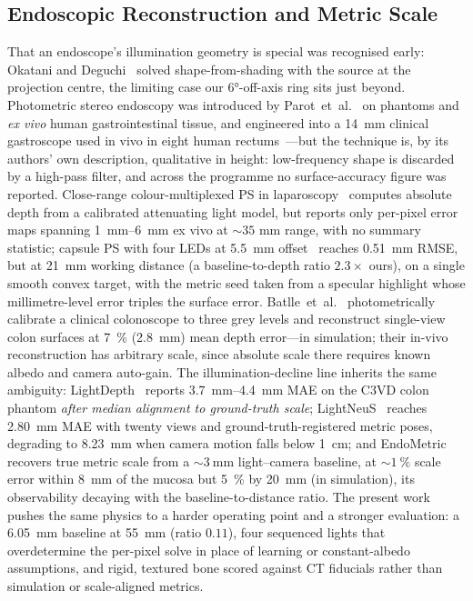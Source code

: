 \documentclass[conference]{IEEEtran}
\begin{document}
\subsection{Endoscopic Reconstruction and Metric Scale}
That an endoscope's illumination geometry is special was recognised
early: Okatani and Deguchi~\cite{okatani1997shape} solved shape-from-shading
with the source at the projection centre, the limiting case our
\ang{6}-off-axis ring sits just beyond.  Photometric stereo endoscopy was
introduced by Parot~et~al.~\cite{parot2013photometric} on phantoms and
\emph{ex vivo} human gastrointestinal tissue, and engineered into a
\SI{14}{\milli\meter} clinical gastroscope used in vivo in eight human
rectums~\cite{durr2014system}---but the technique is, by its authors'
own description, qualitative in height: low-frequency shape is discarded
by a high-pass filter, and across the programme no surface-accuracy
figure was reported.  Close-range colour-multiplexed PS in
laparoscopy~\cite{collins2012close} computes absolute depth from a
calibrated attenuating light model, but reports only per-pixel error maps
spanning \SIrange{1}{6}{\milli\meter} ex vivo at ${\sim}35$ mm range,
with no summary statistic; capsule PS with four LEDs at
\SI{5.5}{\milli\meter} offset~\cite{hao2020capsule} reaches
\SI{0.51}{\milli\meter} RMSE, but at \SI{21}{\milli\meter} working
distance (a baseline-to-depth ratio $2.3\times$ ours), on a single
smooth convex target, with the metric seed taken from a specular
highlight whose millimetre-level error triples the surface error.
Batlle~et~al.~\cite{batlle2022photometric} photometrically calibrate a
clinical colonoscope to three grey levels and reconstruct single-view
colon surfaces at \SI{7}{\percent} (\SI{2.8}{\milli\meter}) mean depth
error---in simulation; their in-vivo reconstruction has arbitrary scale,
since absolute scale there requires known albedo and camera auto-gain.
The illumination-decline line inherits the same ambiguity:
LightDepth~\cite{rodriguezpuigvert2023lightdepth} reports
\SIrange{3.7}{4.4}{\milli\meter} MAE on the C3VD colon phantom
\emph{after median alignment to ground-truth scale};
LightNeuS~\cite{batlle2023lightneus} reaches \SI{2.80}{\milli\meter} MAE
with twenty views and ground-truth-registered metric poses, degrading to
\SI{8.23}{\milli\meter} when camera motion falls below
\SI{1}{\centi\meter}; and EndoMetric~\cite{iranzo2025endometric} recovers
true metric scale from a ${\sim}\SI{3}{\milli\meter}$ light--camera
baseline, at ${\sim}\SI{1}{\percent}$ scale error within \SI{8}{\milli\meter}
of the mucosa but \SI{5}{\percent} by \SI{20}{\milli\meter} (in
simulation), its observability decaying with the baseline-to-distance
ratio.  The present
work pushes the same physics to a harder operating point and a stronger
evaluation: a \SI{6.05}{\milli\meter} baseline at \SI{55}{\milli\meter}
(ratio $0.11$), four sequenced lights that overdetermine the per-pixel
solve in place of learning or constant-albedo assumptions, and rigid,
textured bone scored against CT fiducials rather than simulation or
scale-aligned metrics.
\end{document}
